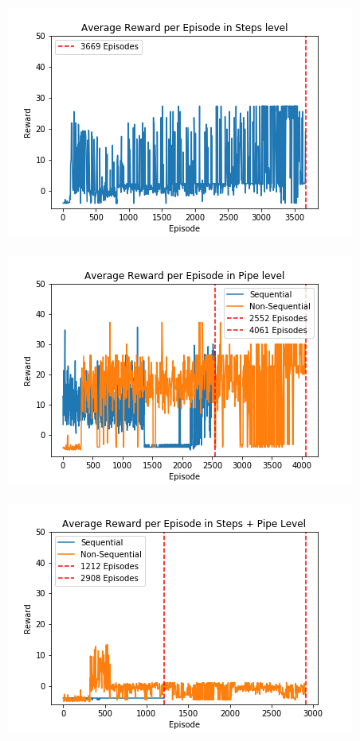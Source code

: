 \documentclass[notitlepage,a4paper,11pt]{article}
\begin{document}
\begin{figure}[htb!]
     \centering
     \begin{subfigure}[t]{0.32\textwidth}
         \centering
         \includegraphics[width=\textwidth]{figs/oc_results_1.png}
         \caption{}
         \label{fig:oc_results_1}
     \end{subfigure}
     \hfill
     \begin{subfigure}[t]{0.32\textwidth}
         \centering
         \includegraphics[width=\textwidth]{figs/oc_results_2.png}
         \caption{}
         \label{fig:oc_results_2}
     \end{subfigure}
     \hfill
     \begin{subfigure}[t]{0.32\textwidth}
         \centering
         \includegraphics[width=\textwidth]{figs/oc_results_3.png}

\end{subfigure}
\end{figure}
\end{document}
